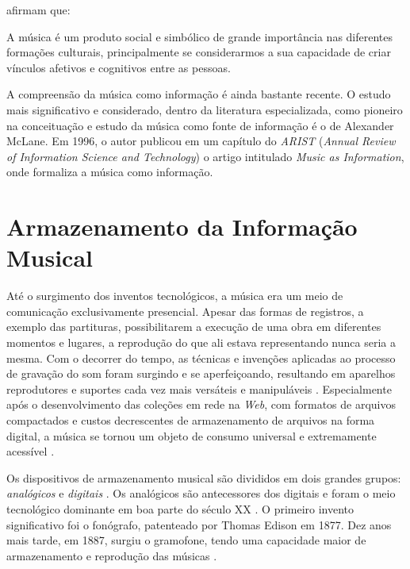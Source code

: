  afirmam que:

\begin{citacao}
A música é um produto social e simbólico de grande importância nas diferentes formações culturais, principalmente se considerarmos a sua capacidade de criar vínculos afetivos e cognitivos entre as pessoas.
\end{citacao}

A compreensão da música como informação é ainda bastante recente. O estudo mais significativo e considerado, dentro da literatura especializada, como pioneiro na conceituação e estudo da música como fonte de informação é o de Alexander McLane. Em 1996, o autor publicou em um capítulo do \textit{ARIST} (\textit{Annual Review of Information Science and Technology}) o artigo intitulado \textit{Music as Information}, onde formaliza a música como informação.

\section{Armazenamento da Informação Musical}

Até o surgimento dos inventos tecnológicos, a música era um meio de comunicação exclusivamente presencial. Apesar das formas de registros, a exemplo das partituras, possibilitarem a execução de uma obra em diferentes momentos e lugares, a reprodução do que ali estava representando nunca seria a mesma. Com o decorrer do tempo,  as técnicas e invenções aplicadas ao processo de gravação do som foram surgindo e se aperfeiçoando, resultando em aparelhos reprodutores e suportes cada vez mais versáteis e manipuláveis \cite{daquino2012}. Especialmente após o desenvolvimento das coleções em rede na \textit{Web}, com formatos de arquivos compactados e custos decrescentes de armazenamento de arquivos na forma digital, a música se tornou um objeto de consumo universal e extremamente acessível \cite{gomes2015}.

Os dispositivos de armazenamento musical são divididos em dois grandes grupos: \textit{analógicos} e \textit{digitais} \cite{andrade&crispim2008}. Os analógicos são antecessores dos digitais e foram o meio tecnológico dominante em boa parte do século XX \cite{paulozuben2004}. O primeiro invento significativo foi o fonógrafo, patenteado por Thomas Edison em 1877. Dez anos mais tarde, em 1887, surgiu o gramofone, tendo uma capacidade maior de armazenamento e reprodução das músicas \cite{marchi2005}. 

